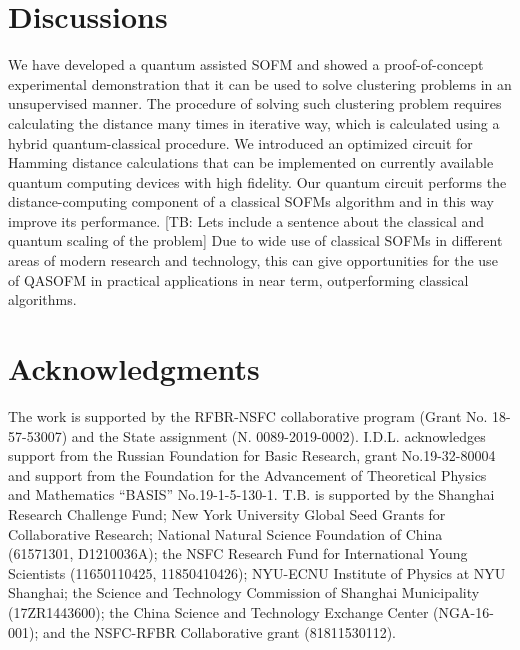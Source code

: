 \documentclass[pra,showkeys,twocolumn,showpacs]{revtex4-1}
\begin{document}
\section{Discussions}
We have developed a quantum assisted SOFM and showed a proof-of-concept experimental demonstration that it can be used to solve clustering problems in an unsupervised manner.  The procedure of solving such clustering problem requires calculating the distance many times in iterative way, which is calculated using a hybrid quantum-classical procedure.  We introduced an optimized circuit for Hamming distance calculations that can be implemented on currently available quantum computing devices with high fidelity. Our quantum circuit performs the distance-computing component of a classical SOFMs algorithm and in this way improve its performance. [TB: Lets include a sentence about the classical and quantum scaling of the problem] 
Due to wide use of classical SOFMs in different areas of modern research and technology, this can give opportunities for the use of QASOFM in practical applications in near term, outperforming classical algorithms.  



\section*{Acknowledgments}
The work is supported by the RFBR-NSFC collaborative program (Grant No. 18-57-53007) and the State assignment (N. 0089-2019-0002). I.D.L. acknowledges support from the Russian Foundation for Basic Research, grant No.19-32-80004 and support from the Foundation for the Advancement of Theoretical Physics and Mathematics “BASIS” No.19-1-5-130-1. T.B. is supported by the Shanghai Research Challenge Fund; New York University Global Seed Grants for Collaborative Research; National Natural Science Foundation of China (61571301, D1210036A); the NSFC Research Fund for International Young Scientists (11650110425, 11850410426); NYU-ECNU Institute of Physics at NYU Shanghai; the Science and Technology Commission of Shanghai Municipality (17ZR1443600); the China Science and Technology Exchange Center (NGA-16-001); and the NSFC-RFBR Collaborative grant (81811530112).





\end{document}
